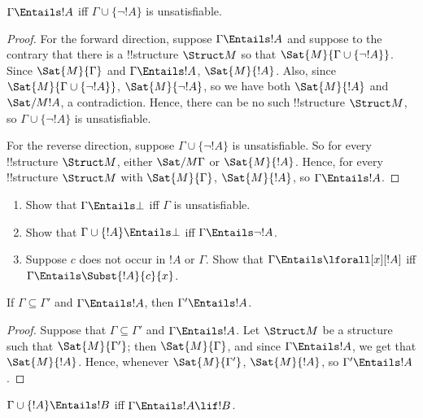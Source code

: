 \documentclass[../../../include/open-logic-section]{subfiles}
\begin{document}
\begin{prop}
$\Gamma \Entails !A$ iff $\Gamma \cup \{\lnot !A\}$ is unsatisfiable.
\end{prop}

\begin{proof}
For the forward direction, suppose $\Gamma \Entails !A$ and suppose to the
contrary that there is a !!{structure} $\Struct M$ so that $\Sat{M}{\Gamma
  \cup \{ \lnot !A \}}$. Since $\Sat{M}{\Gamma}$ and $\Gamma \Entails
!A$, $\Sat{M}{!A}$. Also, since $\Sat{M}{\Gamma\cup \{ \lnot !A \}}$,
$\Sat{M}{\lnot !A}$, so we have both $\Sat{M}{!A}$ and $\Sat/{M}{!A}$,
a contradiction. Hence, there can be no such !!{structure} $\Struct M$, so
$\Gamma \cup \{ \lnot !A \}$ is unsatisfiable.

For the reverse direction, suppose $\Gamma \cup \{ \lnot !A \}$ is
unsatisfiable. So for every !!{structure} $\Struct M$, either
$\Sat/{M}{\Gamma}$ or $\Sat{M}{!A}$. Hence, for every !!{structure}
$\Struct M$ with $\Sat{M}{\Gamma}$, $\Sat{M}{!A}$, so $\Gamma \Entails
!A$.
\end{proof}

\begin{prob}
\begin{enumerate}
\item Show that $\Gamma \Entails \bot$ iff $\Gamma$ is unsatisfiable.
\item Show that $\Gamma \cup \{!A\} \Entails \bot$ iff $\Gamma \Entails \lnot !A$.
\item Suppose $c$ does not occur in $!A$ or $\Gamma$.  Show that
  $\Gamma \Entails \lforall[x][!A]$ iff $\Gamma \Entails
  \Subst{!A}{c}{x}$.
\end{enumerate}
\end{prob}

\begin{prop}
If $\Gamma \subseteq \Gamma'$ and $\Gamma \Entails !A$, then $\Gamma'
\Entails !A$.
\end{prop}

\begin{proof}
Suppose that $\Gamma \subseteq \Gamma'$ and $\Gamma \Entails !A$. Let
$\Struct M$ be a structure such that $\Sat{M}{\Gamma'}$; then $\Sat{M}{\Gamma}$,
and since $\Gamma \Entails !A$, we get that $\Sat{M}{!A}$. Hence,
whenever $\Sat{M}{\Gamma'}$, $\Sat{M}{!A}$, so $\Gamma' \Entails !A$.
\end{proof}


\begin{thm}
$\Gamma \cup \{!A\} \Entails !B$ iff $\Gamma \Entails !A \lif !B$.
\end{thm}
\end{document}
